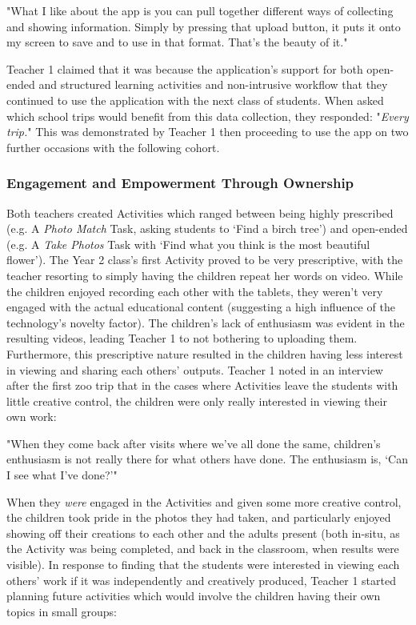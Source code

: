 \begin{displayquote}
"What I like about the app is you can pull together different ways of collecting and showing information. Simply by pressing that upload button, it puts it onto my screen to save and to use in that format. That’s the beauty of it."
\end{displayquote}

Teacher 1 claimed that it was because the application's support for both open-ended and structured learning activities and non-intrusive workflow that they continued to use the application with the next class of students. When asked which school trips would benefit from this data collection, they responded: "\textit{Every trip.}" This was demonstrated by Teacher 1 then proceeding to use the app on two further occasions with the following cohort.

\subsubsection{Engagement and Empowerment Through Ownership}

Both teachers created Activities which ranged between being highly prescribed (e.g. A \textit{Photo Match} Task, asking students to ‘Find a birch tree’) and open-ended (e.g. A \textit{Take Photos} Task with ‘Find what you think is the most beautiful flower’). The Year 2 class's first Activity proved to be very prescriptive, with the teacher resorting to simply having the children repeat her words on video. While the children enjoyed recording each other with the tablets, they weren't very engaged with the actual educational content (suggesting a high influence of the technology’s novelty factor). The children's lack of enthusiasm was evident in the resulting videos, leading Teacher 1 to not bothering to uploading them. Furthermore, this prescriptive nature resulted in the children having less interest in viewing and sharing each others' outputs. Teacher 1 noted in an interview after the first zoo trip that in the cases where Activities leave the students with little creative control, the children were only really interested in viewing their own work: 

\begin{displayquote}
"When they come back after visits where we've all done the same, children's enthusiasm is not really there for what others have done. The enthusiasm is, `Can I see what I've done?'"
\end{displayquote}

When they \textit{were} engaged in the Activities and given some more creative control, the children took pride in the photos they had taken, and particularly enjoyed showing off their creations to each other and the adults present (both in-situ, as the Activity was being completed, and back in the classroom, when results were visible). In response to finding that the students were interested in viewing each others' work if it was independently and creatively produced, Teacher 1 started planning future activities which would involve the children having their own topics in small groups: 

